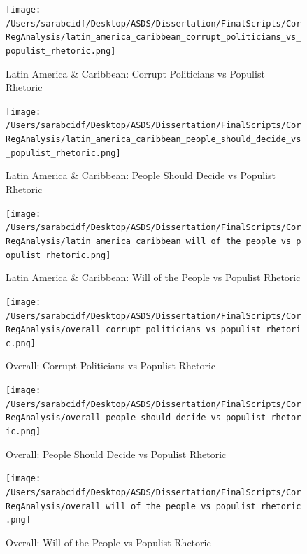 \documentclass[12pt,letterpaper]{article}
\begin{document}
\begin{figure}[H]
	\centering
	\caption{Latin America \& Caribbean: Corrupt Politicians vs Populist Rhetoric}
	\label{fig:latin_america_caribbean_corrupt_politicians_vs_populist_rhetoric}
	\texttt{[image: /Users/sarabcidf/Desktop/ASDS/Dissertation/FinalScripts/CorRegAnalysis/latin\_america\_caribbean\_corrupt\_politicians\_vs\_populist\_rhetoric.png]}
\end{figure}

\begin{figure}[H]
	\centering
	\caption{Latin America \& Caribbean: People Should Decide vs Populist Rhetoric}
	\label{fig:latin_america_caribbean_people_should_decide_vs_populist_rhetoric}
	\texttt{[image: /Users/sarabcidf/Desktop/ASDS/Dissertation/FinalScripts/CorRegAnalysis/latin\_america\_caribbean\_people\_should\_decide\_vs\_populist\_rhetoric.png]}
\end{figure}

\begin{figure}[H]
	\centering
	\caption{Latin America \& Caribbean: Will of the People vs Populist Rhetoric}
	\label{fig:latin_america_caribbean_will_of_the_people_vs_populist_rhetoric}
	\texttt{[image: /Users/sarabcidf/Desktop/ASDS/Dissertation/FinalScripts/CorRegAnalysis/latin\_america\_caribbean\_will\_of\_the\_people\_vs\_populist\_rhetoric.png]}
\end{figure}

\begin{figure}[H]
	\centering
	\caption{Overall: Corrupt Politicians vs Populist Rhetoric}
	\label{fig:overall_corrupt_politicians_vs_populist_rhetoric}
	\texttt{[image: /Users/sarabcidf/Desktop/ASDS/Dissertation/FinalScripts/CorRegAnalysis/overall\_corrupt\_politicians\_vs\_populist\_rhetoric.png]}
\end{figure}

\begin{figure}[H]
	\centering
	\caption{Overall: People Should Decide vs Populist Rhetoric}
	\label{fig:overall_people_should_decide_vs_populist_rhetoric}
	\texttt{[image: /Users/sarabcidf/Desktop/ASDS/Dissertation/FinalScripts/CorRegAnalysis/overall\_people\_should\_decide\_vs\_populist\_rhetoric.png]}
\end{figure}

\begin{figure}[H]
	\centering
	\caption{Overall: Will of the People vs Populist Rhetoric}
	\label{fig:overall_will_of_the_people_vs_populist_rhetoric}
	\texttt{[image: /Users/sarabcidf/Desktop/ASDS/Dissertation/FinalScripts/CorRegAnalysis/overall\_will\_of\_the\_people\_vs\_populist\_rhetoric.png]}
\end{figure}

	
\end{document}

